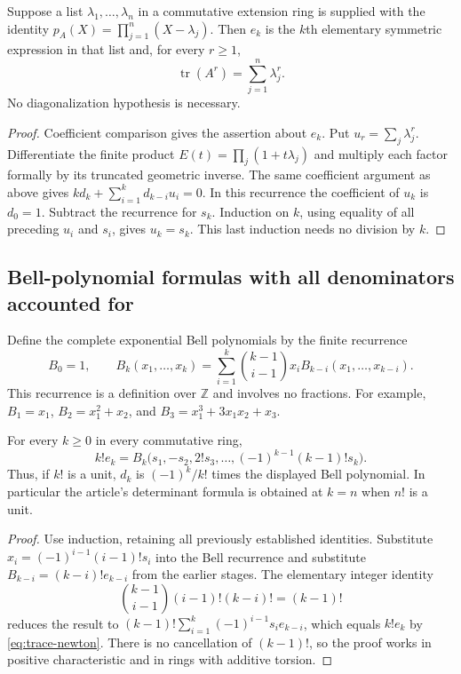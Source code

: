 \begin{proposition}
\label{prop:trace-splitting}
Suppose a list $\lambda_1,\ldots,\lambda_n$ in a commutative extension ring
is supplied with the identity
$p_A(X)=\prod_{j=1}^n(X-\lambda_j)$.  Then $e_k$ is the $k$th elementary
symmetric expression in that list and, for every $r\geq1$,
\[
 \operatorname{tr}(A^r)=\sum_{j=1}^n\lambda_j^r.
\]
No diagonalization hypothesis is necessary.
\end{proposition}
\begin{proof}
Coefficient comparison gives the assertion about $e_k$.  Put
$u_r=\sum_j\lambda_j^r$.  Differentiate the finite product
$E(t)=\prod_j(1+t\lambda_j)$ and multiply each factor formally by its
truncated geometric inverse.  The same coefficient argument as above gives
$k d_k+\sum_{i=1}^k d_{k-i}u_i=0$.  In this recurrence the coefficient of
$u_k$ is $d_0=1$.  Subtract the recurrence for $s_k$.  Induction on $k$,
using equality of all preceding $u_i$ and $s_i$, gives $u_k=s_k$.
This last induction needs no division by $k$.
\end{proof}

\subsection{Bell-polynomial formulas with all denominators accounted for}

Define the complete exponential Bell polynomials by the finite recurrence
\begin{equation}
 B_0=1,\qquad
 B_k(x_1,\ldots,x_k)=
  \sum_{i=1}^{k}\binom{k-1}{i-1}x_iB_{k-i}(x_1,\ldots,x_{k-i}).
 \label{eq:trace-bell-rec}
\end{equation}
This recurrence is a definition over $\mathbb Z$ and involves no fractions.
For example, $B_1=x_1$, $B_2=x_1^2+x_2$, and
$B_3=x_1^3+3x_1x_2+x_3$.

\begin{theorem}
\label{thm:trace-bell}
For every $k\geq0$ in every commutative ring,
\begin{equation}
 k!e_k=B_k\bigl(s_1,-s_2,2!s_3,\ldots,
                    (-1)^{k-1}(k-1)!s_k\bigr).
 \label{eq:trace-bell}
\end{equation}
Thus, if $k!$ is a unit, $d_k$ is $(-1)^k/k!$ times the displayed Bell
polynomial.  In particular the article's determinant formula is obtained
at $k=n$ when $n!$ is a unit.
\end{theorem}
\begin{proof}
Use induction, retaining all previously established identities.  Substitute
$x_i=(-1)^{i-1}(i-1)!s_i$ into the Bell recurrence and substitute
$B_{k-i}=(k-i)!e_{k-i}$ from the earlier stages.  The elementary integer
identity
\[
 \binom{k-1}{i-1}(i-1)!(k-i)!=(k-1)!
\]
reduces the result to
$(k-1)!\sum_{i=1}^k(-1)^{i-1}s_i e_{k-i}$, which equals $k!e_k$ by
\eqref{eq:trace-newton}.  There is no cancellation of $(k-1)!$, so the proof
works in positive characteristic and in rings with additive torsion.
\end{proof}

